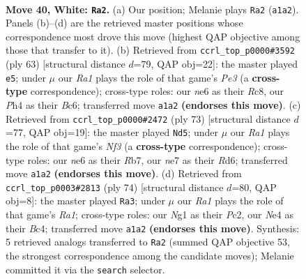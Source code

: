 \documentclass[11pt]{article}
\begin{document}
\clearpage

\begin{figure}[p]\centering
\begin{subfigure}{0.46\textwidth}\centering
\resizebox{\linewidth}{!}{%
\newchessgame
\chessboard[
  setfen={3r1b2/3kn1pr/4n3/7p/P3N2P/6R1/6P1/R2K2N1 w - - 1 40},
  showmover=false,
  pgfstyle=straightmove, color=movearrow, markmove={a1-a2}
]}
\caption{}
\end{subfigure}\hfill
\begin{subfigure}{0.46\textwidth}\centering
\resizebox{\linewidth}{!}{%
\newchessgame
\chessboard[
  setfen={r1r5/p4nk1/2b1p1p1/8/2P4R/4B3/P2NKP2/1R6 b - - 3 32},
  showmover=false,
  pgfstyle=straightmove, color=movearrow, markmove={e6-e5}
]}
\caption{}
\end{subfigure}
\\[4pt]
\begin{subfigure}{0.46\textwidth}\centering
\resizebox{\linewidth}{!}{%
\newchessgame
\chessboard[
  setfen={6k1/pr6/3r1np1/7p/7P/5PP1/2N2RK1/R7 b - - 5 37},
  showmover=false,
  pgfstyle=straightmove, color=movearrow, markmove={f6-d5}
]}
\caption{}
\end{subfigure}\hfill
\begin{subfigure}{0.46\textwidth}\centering
\resizebox{\linewidth}{!}{%
\newchessgame
\chessboard[
  setfen={5r1k/4r2p/P2p1n2/8/2BN1pb1/8/2P5/R1K3R1 w - - 1 38},
  showmover=false,
  pgfstyle=straightmove, color=movearrow, markmove={a1-a3}
]}
\caption{}
\end{subfigure}
\caption{\textbf{Move 40, White: \texttt{Ra2}.} (a) Our position; Melanie plays \texttt{Ra2} (\texttt{a1a2}). Panels (b)--(d) are the retrieved master positions whose correspondence most drove this move (highest QAP objective among those that transfer to it). (b) Retrieved from \texttt{ccrl\_top\_p0000\#3592} (ply 63) [structural distance $d$=79, QAP obj=22]: the master played \texttt{e5}; under $\mu$ our \emph{Ra1} plays the role of that game's \emph{Pe3} (a \textbf{cross-type} correspondence); cross-type roles: our \emph{n}e6 as their \emph{R}c8, our \emph{P}h4 as their \emph{B}c6; transferred move \texttt{a1a2} \textbf{(endorses this move)}. (c) Retrieved from \texttt{ccrl\_top\_p0000\#2472} (ply 73) [structural distance $d$=77, QAP obj=19]: the master played \texttt{Nd5}; under $\mu$ our \emph{Ra1} plays the role of that game's \emph{Nf3} (a \textbf{cross-type} correspondence); cross-type roles: our \emph{n}e6 as their \emph{R}b7, our \emph{n}e7 as their \emph{R}d6; transferred move \texttt{a1a2} \textbf{(endorses this move)}. (d) Retrieved from \texttt{ccrl\_top\_p0003\#2813} (ply 74) [structural distance $d$=80, QAP obj=8]: the master played \texttt{Ra3}; under $\mu$ our \emph{Ra1} plays the role of that game's \emph{Ra1}; cross-type roles: our \emph{N}g1 as their \emph{P}c2, our \emph{N}e4 as their \emph{B}c4; transferred move \texttt{a1a2} \textbf{(endorses this move)}. Synthesis: 5 retrieved analogs transferred to \texttt{Ra2} (summed QAP objective 53, the strongest correspondence among the candidate moves); Melanie committed it via the \texttt{search} selector.}
\label{fig:thought-m78}
\end{figure}
\end{document}
